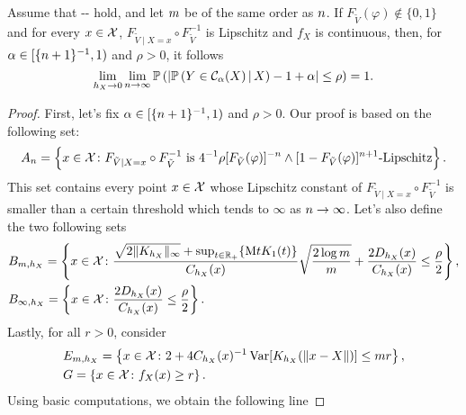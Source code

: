 
\begin{theorem}
  Assume that -- hold, and let $m$ be of the same order as $n$.
  If $F_{\tilde{V}}(\varphi)\notin\{0,1\}$ and for every $x\in\mathcal{X}$, $F_{\tilde{V}\mid X=x}\circ F_{\tilde{V}}^{-1}$ is Lipschitz and $f_X$ is continuous, then, for $\alpha\in[\{n+1\}^{-1},1)$ and $\rho>0$, it follows
  \begin{equation*}
    \lim_{h_{X}\to 0}\lim_{n\to \infty} \mathbb{P}\left({
      \left\lvert{ \mathbb{P}\left({Y\in \mathcal{C}_{\alpha}(X) \,\vert\, X}\right) - 1 + \alpha }\right\rvert
      \le \rho
    }\right)
    = 1
    .
  \end{equation*}
\end{theorem}

\begin{proof}
  First, let's fix $\alpha\in[\{n+1\}^{-1},1)$ and $\rho>0$.
  Our proof is based on the following set:
  \begin{equation*}
    A_{n}
    = \left\{{
      x\in\mathcal{X} \colon F_{\tilde{V}\mid X=x}\circ F_{\tilde{V}}^{-1} \text{ is $4^{-1}\rho [{F_{\tilde{V}}(\varphi)}]^{-n} \wedge [{1 - F_{\tilde{V}}(\varphi)}]^{n+1}$-Lipschitz}
    }\right\}.
  \end{equation*}
  This set contains every point $x\in\mathcal{X}$ whose Lipschitz constant of $F_{\tilde{V}\mid X=x}\circ F_{\tilde{V}}^{-1}$ is smaller than a certain threshold which tends to $\infty$ as $n\to \infty$.
  Let's also define the two following sets
  \begin{align*}
    &B_{m,h_{X}}
    = \left\{{
      x\in\mathcal{X} \colon \frac{ \sqrt{2\|{K_{h_{X}}}\|_{\infty}} + \sup_{t\in\mathbb{R}_+}\{{\mathrm{M} t K_{1}(t)}\} }{ C_{h_{X}}(x) } \sqrt{\frac{ 2 \log m }{ m }}
      + \frac{2 D_{h_{X}}(x)}{C_{h_{X}}(x)}
      \le \frac{\rho}{2}
    }\right\},
    \\
    &B_{\infty,h_{X}}
    = \left\{{
      x\in\mathcal{X} \colon \frac{2 D_{h_{X}}(x)}{C_{h_{X}}(x)}
      \le \frac{\rho}{2}
    }\right\}.
  \end{align*}
  Lastly, for all $r>0$, consider
  \begin{align*}%
    &E_{\ccount,h_{X}}
    = \ac{
      x\in\XC \colon 2 + 4 C_{h_{X}}(x)^{-1} \var[K_{h_{X}}(\|x - X\|)] \le \ccount r
    },
    \\
    &G = \ac{
      x\in\XC \colon f_{X}(x) \ge r
    }.
  \end{align*}
  Using basic computations, we obtain the following line

\end{proof}
